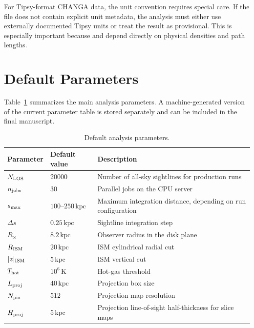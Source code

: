 \documentclass[twocolumn]{aastex631}
\newcommand{\DM}{\mathrm{DM}}
\newcommand{\EM}{\mathrm{EM}}
\newcommand{\kpc}{\mathrm{kpc}}
\begin{document}
For Tipsy-format CHANGA data, the unit convention requires special care.  If the file does not contain explicit unit metadata, the analysis must either use externally documented Tipsy units or treat the result as provisional.  This is especially important because \DM{} and \EM{} depend directly on physical densities and path lengths.

\section{Default Parameters}\label{sec:params}
Table~\ref{tab:params} summarizes the main analysis parameters.  A machine-generated version of the current parameter table is stored separately and can be included in the final manuscript.

\begin{table}
\centering
\caption{Default analysis parameters.}
\label{tab:params}
\begin{tabular}{lll}
\toprule
Parameter & Default value & Description \\
\midrule
$N_{\rm LOS}$ & 20000 & Number of all-sky sightlines for production runs \\
$n_{\rm jobs}$ & 30 & Parallel jobs on the CPU server \\
$s_{\rm max}$ & $100$--$250\,\kpc$ & Maximum integration distance, depending on run configuration \\
$\Delta s$ & $0.25\,\kpc$ & Sightline integration step \\
$R_{\odot}$ & $8.2\,\kpc$ & Observer radius in the disk plane \\
$R_{\rm ISM}$ & $20\,\kpc$ & ISM cylindrical radial cut \\
$|z|_{\rm ISM}$ & $5\,\kpc$ & ISM vertical cut \\
$T_{\rm hot}$ & $10^6\,\mathrm{K}$ & Hot-gas threshold \\
$L_{\rm proj}$ & $40\,\kpc$ & Projection box size \\
$N_{\rm pix}$ & $512$ & Projection map resolution \\
$H_{\rm proj}$ & $5\,\kpc$ & Projection line-of-sight half-thickness for slice maps \\
\bottomrule
\end{tabular}
\end{table}

% 
\end{document}

